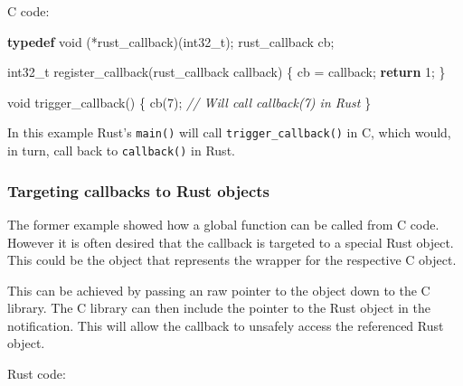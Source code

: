 \documentclass[a4paper,]{book}
\newenvironment{Shaded}{\begin{snugshade}}{\end{snugshade}}
\newcommand{\KeywordTok}[1]{\textcolor[rgb]{0.13,0.29,0.53}{\textbf{{#1}}}}
\newcommand{\DataTypeTok}[1]{\textcolor[rgb]{0.13,0.29,0.53}{{#1}}}
\newcommand{\DecValTok}[1]{\textcolor[rgb]{0.00,0.00,0.81}{{#1}}}
\newcommand{\CommentTok}[1]{\textcolor[rgb]{0.56,0.35,0.01}{\textit{{#1}}}}
\newcommand{\NormalTok}[1]{{#1}}
\begin{document}
C code:

\begin{Shaded}
\begin{Highlighting}[]
\KeywordTok{typedef} \DataTypeTok{void} \NormalTok{(*rust_callback)(}\DataTypeTok{int32_t}\NormalTok{);}
\NormalTok{rust_callback cb;}

\DataTypeTok{int32_t} \NormalTok{register_callback(rust_callback callback) \{}
    \NormalTok{cb = callback;}
    \KeywordTok{return} \DecValTok{1}\NormalTok{;}
\NormalTok{\}}

\DataTypeTok{void} \NormalTok{trigger_callback() \{}
  \NormalTok{cb(}\DecValTok{7}\NormalTok{); }\CommentTok{// Will call callback(7) in Rust}
\NormalTok{\}}
\end{Highlighting}
\end{Shaded}

In this example Rust's \texttt{main()} will call
\texttt{trigger\_callback()} in C, which would, in turn, call back to
\texttt{callback()} in Rust.

\subsubsection{Targeting callbacks to Rust
objects}\label{targeting-callbacks-to-rust-objects}

The former example showed how a global function can be called from C
code. However it is often desired that the callback is targeted to a
special Rust object. This could be the object that represents the
wrapper for the respective C object.

This can be achieved by passing an raw pointer to the object down to the
C library. The C library can then include the pointer to the Rust object
in the notification. This will allow the callback to unsafely access the
referenced Rust object.

Rust code:
\end{document}
